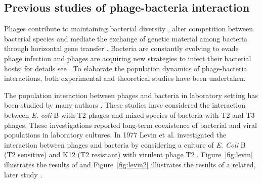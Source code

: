 \subsection{Previous studies of phage-bacteria interaction}
Phages contribute to maintaining bacterial diversity \citep{buckling_role_2002}, alter competition between bacterial species \citep{bohannan_relative_2000} and mediate the exchange of genetic material among bacteria through horizontal gene transfer \citep{soucy_horizontal_2015, canchaya_prophage_2003}. Bacteria are constantly evolving to evade phage infection and phages are acquiring new strategies to infect their bacterial hosts; for details see \citep{rostol_phighting_2019, koskella_bacteriaphage_2014}. To elaborate the population dynamics of phage-bacteria interactions, both experimental and theoretical studies have been undertaken.


The population interaction between phages and bacteria in laboratory setting has been studied by many authors \citep{horne_coevolution_1970, levin_resource-limited_1977,lenski_constraints_1985, bohannan_effect_1997}. 
These studies have considered the interaction between \textit{E. coli} B with T2 phages and mixed species of bacteria with T2 and T3 phages. These investigations reported long-term coexistence of bacterial and viral populations in laboratory cultures. In 1977 Levin et al.  investigated the interaction between phages and bacteria by considering a culture of \textit{E. Coli} B (T2 sensitive) and K12 (T2 resistant) with virulent phage T2 \citep{levin_resource-limited_1977}.  Figure~\ref{fig:levin}  illustrates the results of \citep{levin_resource-limited_1977} and Figure~\ref{fig:levin2} illustrates the results of a related, later study  \citep{bohannan_effect_1999}.

